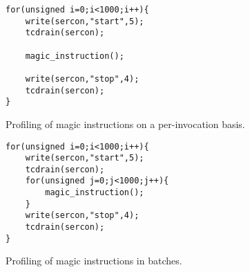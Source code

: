 

\begin{figure}
\centering
\begin{minipage}{.5\textwidth}
	\centering
	
\begin{lstlisting}
for(unsigned i=0;i<1000;i++){
	write(sercon,"start",5);
	tcdrain(sercon);

	magic_instruction();

	write(sercon,"stop",4);
	tcdrain(sercon);
}
\end{lstlisting}
	
	\caption{Profiling of magic instructions on a per-invocation basis.}
	\label{fig:magicinstructionpseudocodeforeach}
\end{minipage}%
\begin{minipage}{.5\textwidth}
	\centering
	
\begin{lstlisting}
for(unsigned i=0;i<1000;i++){
	write(sercon,"start",5);
	tcdrain(sercon);
	for(unsigned j=0;j<1000;j++){
		magic_instruction();
	}
	write(sercon,"stop",4);
	tcdrain(sercon);
}
\end{lstlisting}
	
	\caption{Profiling of magic instructions in batches.}
	\label{fig:magicinstructionpseudocodeforall}
\end{minipage}
\end{figure}